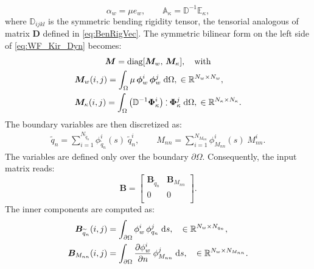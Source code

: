 \documentclass[11pt]{article}
\def\onedot{$\mathsurround0pt\ldotp$}
\def\cddot{%
	\mathbin{\vcenter{\baselineskip.67ex
			\hbox{\onedot}\hbox{\onedot}}%
}}
\begin{document}
{		\begin{equation}
		\alpha_w = \mu e_w, \qquad \mathbb{A}_{\kappa} = \mathbb{D}^{-1} \mathbb{E}_{\kappa},
		\end{equation}
		where $\mathbb{D}_{ijkl}$ is the symmetric bending rigidity tensor, the tensorial analogous of  matrix $\bm{D}$ defined in \eqref{eq:BenRigVec}. The symmetric bilinear form on the left side of \eqref{eq:WF_Kir_Dyn} becomes: 
		\begin{equation}
		\begin{gathered}
		\bm{M} = \text{diag}[\bm{M}_w,\, \bm{M}_\kappa], \quad \text{with} \\
		\begin{aligned}
		&\bm{M}_w(i,j) = \int_{\Omega} \mu \, \bm{\phi}_w^i \, \bm{\phi}_w^j \d\Omega, \; \in \mathbb{R}^{N_w \times N_w}, \\
		&\bm{M}_\kappa(i,j) = \int_{\Omega}  \left( \mathbb{D}^{-1} \bm{\Phi}_\kappa^i \right) \cddot \bm{\Phi}_\kappa^j \d\Omega, \; \in \mathbb{R}^{N_\kappa \times N_\kappa}.\\
		\end{aligned}
		\end{gathered}
		\end{equation}
		The boundary variables are then discretized as:
		\begin{equation}
		\begin{aligned}
		\widetilde{q}_n = \sum_{i = 1}^{N_{\widetilde{q}_n}} \phi_{\widetilde{q}_n}^i(s) \; \widetilde{q}_n^i, \qquad
		M_{nn} = \sum_{i = 1}^{N_{M_{nn}}} \phi_{M_{nn}}^i(s) \; M_{nn}^i.
		\end{aligned}
		\end{equation}
		The variables are defined only over the boundary $\partial\Omega$. Consequently, the input matrix reads:
		\begin{equation}
		\bm{B} = \begin{bmatrix}
		\bm{B}_{\widetilde{q}_n} & \bm{B}_{M_{nn}}\\
		0 & 0 \\
		\end{bmatrix}. 
		\end{equation}
		The inner components are computed as:
		\begin{equation}
		\begin{aligned}
		\bm{B}_{\widetilde{q}_n}(i,j) &= \int_{\partial\Omega} {\phi}_{w}^i \, {\phi}_{q_n}^j \d{s}, \quad \in \mathbb{R}^{N_w \times N_{q_n}} , \\
		\bm{B}_{M_{nn}}(i,j) &= \int_{\partial\Omega} \diffp{\phi_w^i}{n} \, \phi_{M_{nn}}^j \d{s}, \quad \in \mathbb{R}^{N_w \times N_{M_{nn}}} . \\

\end{aligned}
\end{equation}}
\end{document}
